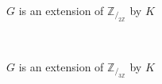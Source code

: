 \begin{case*}[$(C ~2)$ ]~

\begin{minipage}{4cm}
  \begin{figure}[H]
  \end{figure}
\end{minipage}\qquad 
\begin{minipage}{4cm}
   $G$ is an extension of $\mathbb {Z}_{/_{2
      \mathbb {Z}}} $ by $K$ 
\end{minipage}
\end{case*}

\begin{case*}[$(C~ 3)$ ]~ 

\begin{minipage}{4cm}
  \begin{figure}[H]
  \end{figure}
\end{minipage}\qquad 
\begin{minipage}{4cm}
 $G$ is an extension of $\mathbb {Z}_{/_{3
      \mathbb {Z}}} $ by $K$ 
\end{minipage}
\end{case*}

